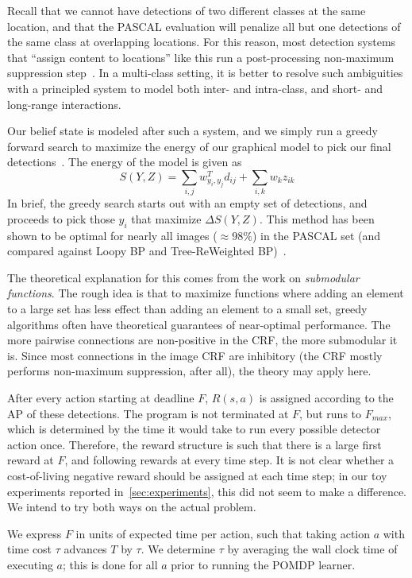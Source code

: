 Recall that we cannot have detections of two different classes at the same location, and that the PASCAL evaluation will penalize all but one detections of the same class at overlapping locations.
For this reason, most detection systems that ``assign content to locations'' like this run a post-processing non-maximum suppression step~\cite{Felzenszwalb2010a}.
In a multi-class setting, it is better to resolve such ambiguities with a principled system to model both inter- and intra-class, and short- and long-range interactions.

Our belief state is modeled after such a system, and we simply run a greedy forward search to maximize the energy of our graphical model to pick our final detections~\cite{Desai2009}.
The energy of the model is given as
\begin{equation}
  S(Y,Z) = \sum_{i,j} w_{y_i,y_j}^T d_{ij} + \sum_{i,k} w_{k} z_{ik}
\end{equation}
In brief, the greedy search starts out with an empty set of detections, and proceeds to pick those $y_i$ that maximize $\Delta S(Y,Z)$.
This method has been shown to be optimal for nearly all images ($\approx98\%$) in the PASCAL set (and compared against Loopy BP and Tree-ReWeighted BP)~\cite{Desai2009}.

The theoretical explanation for this comes from the work on \emph{submodular functions}.
The rough idea is that to maximize functions where adding an element to a large set has less effect than adding an element to a small set, greedy algorithms often have theoretical guarantees of near-optimal performance.
The more pairwise connections are non-positive in the CRF, the more submodular it is.
Since most connections in the image CRF are inhibitory (the CRF mostly performs non-maximum suppression, after all), the theory may apply here.

After every action starting at deadline $F$, $R(s,a)$ is assigned according to the AP of these detections.
The program is not terminated at $F$, but runs to $F_{max}$, which is determined by the time it would take to run every possible detector action once.
Therefore, the reward structure is such that there is a large first reward at $F$, and following rewards at every time step.
It is not clear whether a cost-of-living negative reward should be assigned at each time step; in our toy experiments reported in~\autoref{sec:experiments}, this did not seem to make a difference.
We intend to try both ways on the actual problem.

We express $F$ in units of expected time per action, such that taking action $a$ with time cost $\tau$ advances $T$ by $\tau$.
We determine $\tau$ by averaging the wall clock time of executing $a$; this is done for all $a$ prior to running the POMDP learner.

